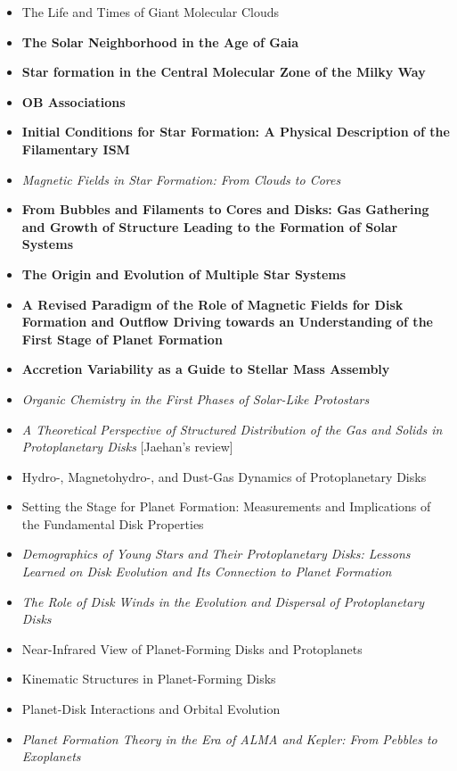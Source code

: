 \documentclass[11pt]{article}
\begin{document}
\begin{itemize}
 \item The Life and Times of Giant Molecular Clouds	
 \item \textbf{The Solar Neighborhood in the Age of Gaia}
 \item \textbf{Star formation in the Central Molecular Zone of the Milky Way}
 \item \textbf{OB Associations}
 \item \textbf{Initial Conditions for Star Formation: A Physical Description of the Filamentary ISM}
 \item \textit{Magnetic Fields in Star Formation: From Clouds to Cores}
 \item \textbf{From Bubbles and Filaments to Cores and Disks: Gas Gathering and Growth of Structure Leading to the Formation of Solar Systems}
 \item \textbf{The Origin and Evolution of Multiple Star Systems}
 \item \textbf{A Revised Paradigm of the Role of Magnetic Fields for Disk Formation and Outflow Driving towards an Understanding of the First Stage of Planet Formation}
 \item \textbf{Accretion Variability as a Guide to Stellar Mass Assembly}
 \item \textit{Organic Chemistry in the First Phases of Solar-Like Protostars}
 \item \textit{A Theoretical Perspective of Structured Distribution of the Gas and Solids in Protoplanetary Disks} [Jaehan's review]
 \item Hydro-, Magnetohydro-, and Dust-Gas Dynamics of Protoplanetary Disks
 \item Setting the Stage for Planet Formation: Measurements and Implications of the Fundamental Disk Properties
 \item \textit{Demographics of Young Stars and Their Protoplanetary Disks: Lessons Learned on Disk Evolution and Its Connection to Planet Formation}
 \item \textit{The Role of Disk Winds in the Evolution and Dispersal of Protoplanetary Disks}
 \item Near-Infrared View of Planet-Forming Disks and Protoplanets
 \item Kinematic Structures in Planet-Forming Disks
 \item Planet-Disk Interactions and Orbital Evolution
 \item \textit{Planet Formation Theory in the Era of ALMA and Kepler: From Pebbles to Exoplanets}

\end{itemize}
\end{document}
